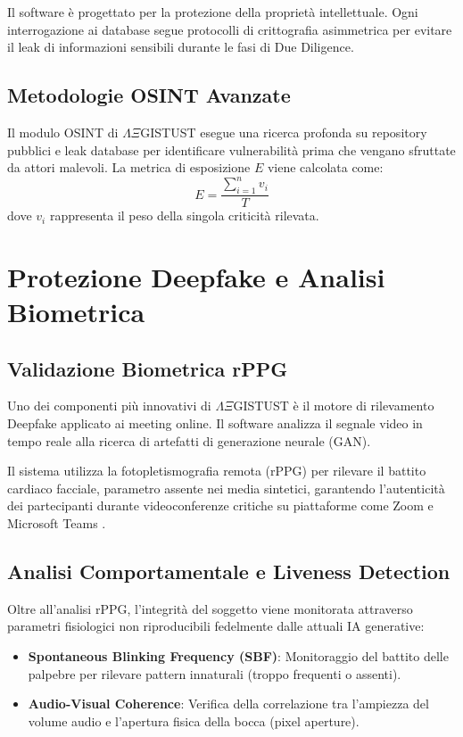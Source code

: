 \documentclass[12pt,a4paper,oneside]{book}
\newcommand{\aegistrust}{$\Lambda\Xi$GIST\reflectbox{R}UST}
\newenvironment{industrialNote}
{\begin{tcolorbox}[colback=blue!5,colframe=blue!75!black,title=Specifiche Industriali]}
{\end{tcolorbox}}
\begin{document}
\begin{industrialNote}
Il software è progettato per la protezione della proprietà intellettuale. Ogni interrogazione ai database segue protocolli di crittografia asimmetrica per evitare il leak di informazioni sensibili durante le fasi di Due Diligence.
\end{industrialNote}

\section{Metodologie OSINT Avanzate}
Il modulo OSINT di \aegistrust{} esegue una ricerca profonda su repository pubblici e leak database per identificare vulnerabilità prima che vengano sfruttate da attori malevoli. La metrica di esposizione $E$ viene calcolata come:
\[ E = \frac{\sum_{i=1}^{n} v_i}{T} \]
dove $v_i$ rappresenta il peso della singola criticità rilevata.

\chapter{Protezione Deepfake e Analisi Biometrica}

\section{Validazione Biometrica rPPG}
Uno dei componenti più innovativi di \aegistrust{} è il motore di rilevamento Deepfake applicato ai meeting online. Il software analizza il segnale video in tempo reale alla ricerca di artefatti di generazione neurale (GAN).

Il sistema utilizza la fotopletismografia remota (rPPG) per rilevare il battito cardiaco facciale, parametro assente nei media sintetici, garantendo l'autenticità dei partecipanti durante videoconferenze critiche su piattaforme come Zoom e Microsoft Teams \cite{deepfake2026}.

\section{Analisi Comportamentale e Liveness Detection}
Oltre all'analisi rPPG, l'integrità del soggetto viene monitorata attraverso parametri fisiologici non riproducibili fedelmente dalle attuali IA generative:
\begin{itemize}
    \item \textbf{Spontaneous Blinking Frequency (SBF)}: Monitoraggio del battito delle palpebre per rilevare pattern innaturali (troppo frequenti o assenti).
    \item \textbf{Audio-Visual Coherence}: Verifica della correlazione tra l'ampiezza del volume audio e l'apertura fisica della bocca (pixel aperture).
\end{itemize}
\end{document}
